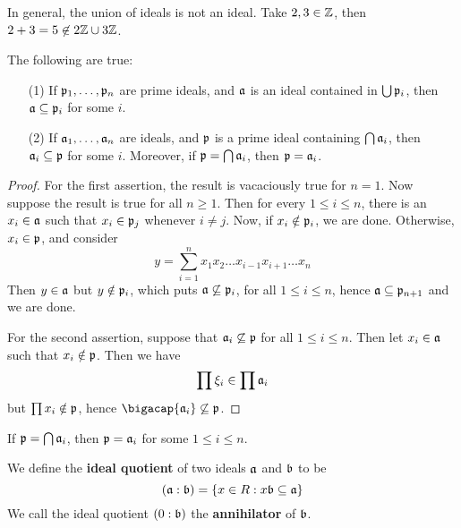 \begin{example}\label{example_5.19}
  In general, the union of ideals is not an ideal. Take $2,3 \in \Z$, then
  $2+3=5 \not\in 2\Z \cup 3\Z$.
\end{example}


\begin{theorem}\label{theorem_5.5.11}
  The following are true:
  \begin{enumerate}
    \item[(1)] If $\pf_1, \dots, \pf_n$ are prime ideals, and $\af$ is an ideal
      contained in  $\bigcup{\pf_i}$, then $\af \subseteq \pf_i$ for some $i$.

    \item[(2)] If $\af_1, \dots, \af_n$ are ideals, and $\pf$ is a prime ideal
      containing  $\bigcap{\af_i}$, then $\af_i \subseteq \pf$ for some $i$.
      Moreover, if  $\pf=\bigcap{\af_i}$, then $\pf=\af_i$.
  \end{enumerate}
\end{theorem}
\begin{proof}
  For the first assertion, the result is vacaciously true for $n=1$. Now
  suppose the result is true for all  $n \geq 1$. Then for every  $1 \leq i
  \leq n$, there is an  $x_i \in \af$ such that  $x_i \in \pf_j$ whenever  $i
  \neq j$. Now, if  $x_i \notin \pf_i$, we are done. Otherwise, $x_i \in \pf$,
  and consider
  \begin{equation*}
    y=\sum_{i=1}^n{x_1x_2 \dots x_{i-1}x_{i+1} \dots x_n}
  \end{equation*}
  Then $y \in \af$ but $y \notin \pf_i$, which puts  $\af \not\subseteq
  \pf_i$, for all $1 \leq i \leq n$, hence $\af \subseteq \pf_{n+1}$ and we
  are done.

  For the second assertion, suppose that $\af_i \not\subseteq \pf$ for all
  $1 \leq i \leq n$. Then let  $x_i \in \af$ such that  $x_i \notin\pf$. Then
  we have
  \begin{equation*}
    \prod{\x_i} \in \prod{\af_i}
  \end{equation*}
  but $\prod{x_i} \notin \pf$, hence $\bigacap{\af_i} \not\subseteq \pf$.
\end{proof}
\begin{corollary}
  If $\pf=\bigcap{\af_i}$, then $\pf=\af_i$ for some  $1 \leq i \leq n$.
\end{corollary}

\begin{definition}
  We define the \textbf{ideal quotient} of two ideals $\af$ and $\bf$ to be
  \begin{equation*}
    (\af:\bf)=\{x \in R : x\bf \subseteq \af\}
  \end{equation*}
  We call the ideal quotient $(0:\bf)$ the \textbf{annihilator} of $\bf$.
\end{definition}

